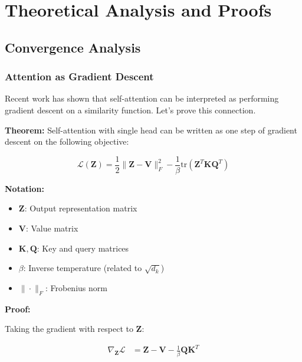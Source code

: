 
\section{Theoretical Analysis and Proofs}

\subsection{Convergence Analysis}

\subsubsection{Attention as Gradient Descent}

Recent work has shown that self-attention can be interpreted as performing gradient descent on a similarity function. Let's prove this connection.

\textbf{Theorem:} Self-attention with single head can be written as one step of gradient descent on the following objective:

\begin{equation}
\mathcal{L}(\mathbf{Z}) = \frac{1}{2} \|\mathbf{Z} - \mathbf{V}\|_F^2 - \frac{1}{\beta} \text{tr}(\mathbf{Z}^T \mathbf{K} \mathbf{Q}^T)
\end{equation}

\begin{notationbox}
\textbf{Notation:}
\begin{itemize}
    \item $\mathbf{Z}$: Output representation matrix
    \item $\mathbf{V}$: Value matrix
    \item $\mathbf{K}, \mathbf{Q}$: Key and query matrices
    \item $\beta$: Inverse temperature (related to $\sqrt{d_k}$)
    \item $\|\cdot\|_F$: Frobenius norm
\end{itemize}
\end{notationbox}

\textbf{Proof:}

Taking the gradient with respect to $\mathbf{Z}$:

\begin{align}
\nabla_{\mathbf{Z}} \mathcal{L} &= \mathbf{Z} - \mathbf{V} - \frac{1}{\beta} \mathbf{Q} \mathbf{K}^T \\
\end{align}


